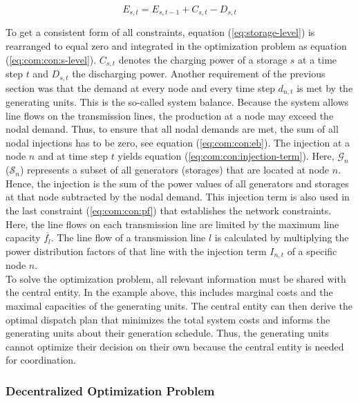 \begin{equation}
	\label{eq:storage-level}
	E_{s,t} = E_{s,t-1} + C_{s,t} - D_{s,t}
\end{equation}

To get a consistent form of all constraints, equation (\ref{eq:storage-level}) is rearranged to equal zero and integrated in the optimization problem as equation (\ref{eq:com:con:s-level}). $C_{s,t}$ denotes the charging power of a storage $s$ at a time step $t$ and $D_{s,t}$ the discharging power. Another requirement of the previous section was that the demand at every node and every time step $d_{n,t}$ is met by the generating units. This is the so-called system balance. Because the system allows line flows on the transmission lines, the production at a node may exceed the nodal demand. Thus, to ensure that all nodal demands are met, the sum of all nodal injections has to be zero, see equation (\ref{eq:com:con:eb}). The injection at a node $n$ and at time step $t$ yields equation (\ref{eq:com:con:injection-term}). Here, $\mathcal{G}_n$ ($\mathcal{S}_n$) represents a subset of all generators (storages) that are located at node $n$. Hence, the injection is the sum of the power values of all generators and storages at that node subtracted by the nodal demand. This injection term is also used in the last constraint (\ref{eq:com:con:pf}) that establishes the network constraints. Here, the line flows on each transmission line are limited by the maximum line capacity $\overline{f_l}$. The line flow of a transmission line $l$ is calculated by multiplying the power distribution factors of that line with the injection term $I_{n,t}$ of a specific node $n$.\\
	
To solve the optimization problem, all relevant information must be shared with the central entity. In the example above, this includes marginal costs and the maximal capacities of the generating units. The central entity can then derive the optimal dispatch plan that minimizes the total system costs and informs the generating units about their generation schedule. Thus, the generating units cannot optimize their decision on their own because the central entity is needed for coordination.	

\subsubsection{Decentralized Optimization Problem}
\label{sec:app:dom}

